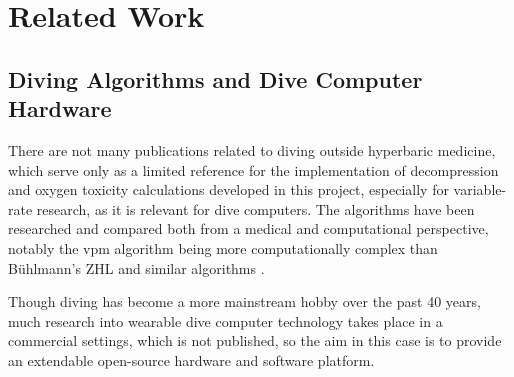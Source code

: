 
\chapter{Related Work}


\section{Diving Algorithms and Dive Computer Hardware}
There are not many publications related to diving outside hyperbaric medicine, which serve only as a limited reference for the implementation of decompression and oxygen toxicity calculations developed in this project, especially for variable-rate research, as it is relevant for dive computers.
The algorithms have been researched and compared both from a medical and computational perspective, notably the \gls{vpm} algorithm being more computationally complex than Bühlmann's ZHL and similar algorithms \cite{understanding-modern-dive-computers}.

Though diving has become a more mainstream hobby over the past 40 years, much research into wearable dive computer technology takes place in a commercial settings, which is not published, so the aim in this case is to provide an extendable open-source hardware and software platform.

